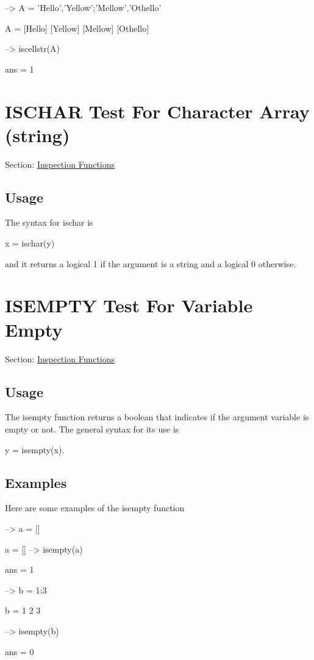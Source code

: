 \begin{DoxyVerbInclude}
--> A = {'Hello','Yellow';'Mellow','Othello'}

A = 
 [Hello] [Yellow] 
 [Mellow] [Othello] 

--> iscellstr(A)

ans = 
 1 
\end{DoxyVerbInclude}
 \hypertarget{inspection_ischar}{}\section{I\-S\-C\-H\-A\-R Test For Character Array (string)}\label{inspection_ischar}
Section\-: \hyperlink{sec_inspection}{Inspection Functions} \hypertarget{vtkwidgets_vtkxyplotwidget_Usage}{}\subsection{Usage}\label{vtkwidgets_vtkxyplotwidget_Usage}
The syntax for {\ttfamily ischar} is \begin{DoxyVerb}   x = ischar(y)
\end{DoxyVerb}
 and it returns a logical 1 if the argument is a string and a logical 0 otherwise. \hypertarget{inspection_isempty}{}\section{I\-S\-E\-M\-P\-T\-Y Test For Variable Empty}\label{inspection_isempty}
Section\-: \hyperlink{sec_inspection}{Inspection Functions} \hypertarget{vtkwidgets_vtkxyplotwidget_Usage}{}\subsection{Usage}\label{vtkwidgets_vtkxyplotwidget_Usage}
The {\ttfamily isempty} function returns a boolean that indicates if the argument variable is empty or not. The general syntax for its use is \begin{DoxyVerb}  y = isempty(x).
\end{DoxyVerb}
 \hypertarget{variables_matrix_Examples}{}\subsection{Examples}\label{variables_matrix_Examples}
Here are some examples of the {\ttfamily isempty} function


\begin{DoxyVerbInclude}
--> a = []

a = 
  []
--> isempty(a)

ans = 
 1 

--> b = 1:3

b = 
 1 2 3 

--> isempty(b)

ans = 
 0 
\end{DoxyVerbInclude}


